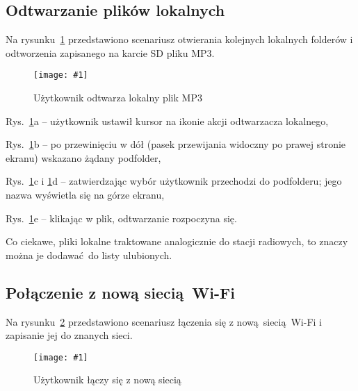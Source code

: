 \documentclass[polish]{aghengthesis}
\let\tempone\itemize
\let\temptwo\enditemize
\renewenvironment{itemize}{\tempone\setlength{\itemsep}{0cm}}{\temptwo}
\newcommand{\imgint}[4]{
	\begin{figure}[{#4}]
		\centering
		\texttt{[image: \#1]}
		\caption{#2}
		\label{#1}
	\end{figure}
}
\newcommand{\imgh}[3]{\imgint{#1}{#2}{#3}{H}}
\begin{document}
		\subsection{Odtwarzanie plików lokalnych}
			\newcommand{\rflocal}[1]{\ref{5/PicoRadio-fl-local}#1}
			
			Na rysunku~\rflocal{} przedstawiono scenariusz otwierania kolejnych lokalnych folderów i odtworzenia zapisanego na karcie SD pliku MP3.
			
			\imgh{5/PicoRadio-fl-local}{Użytkownik odtwarza lokalny plik MP3}{0.9}	
			
			\begin{itemize}
				\item Rys.~\rflocal{a} -- użytkownik ustawił kursor na ikonie akcji odtwarzacza lokalnego,
				\item Rys.~\rflocal{b} -- po przewinięciu w dół (pasek przewijania widoczny po prawej stronie ekranu) wskazano żądany podfolder,
				\item Rys.~\rflocal{c} i \rflocal{d} -- zatwierdzając wybór użytkownik przechodzi do podfolderu; jego nazwa wyświetla się na górze ekranu,
				\item Rys.~\rflocal{e} -- klikając w plik, odtwarzanie rozpoczyna się.
			\end{itemize}
			
			Co ciekawe, pliki lokalne traktowane analogicznie do stacji radiowych, to znaczy można je dodawać do listy ulubionych.
			
		\subsection{Połączenie z nową siecią Wi-Fi}
			\newcommand{\rflwifi}[1]{\ref{5/PicoRadio-fl-wifi}#1}
			
			Na rysunku~\rflwifi{} przedstawiono scenariusz łączenia się z nową siecią Wi-Fi i zapisanie jej do znanych sieci.
			
			\imgh{5/PicoRadio-fl-wifi}{Użytkownik łączy się z nową siecią}{0.9}
			
\end{document}
